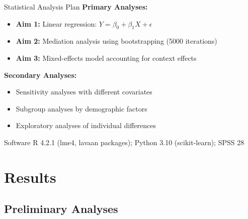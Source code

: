 \documentclass[aspectratio=169,11pt]{beamer}
\begin{document}
\begin{frame}{Statistical Analysis Plan}
  \textbf{Primary Analyses:}
  \begin{itemize}
    \item \textbf{Aim 1:} Linear regression: $Y = \beta_0 + \beta_1 X + \epsilon$
    \item \textbf{Aim 2:} Mediation analysis using bootstrapping (5000 iterations)
    \item \textbf{Aim 3:} Mixed-effects model accounting for context effects
  \end{itemize}

  \vspace{0.5cm}

  \textbf{Secondary Analyses:}
  \begin{itemize}
    \item Sensitivity analyses with different covariates
    \item Subgroup analyses by demographic factors
    \item Exploratory analyses of individual differences
  \end{itemize}

  \vspace{0.5cm}

  \begin{block}{Software}
    R 4.2.1 (lme4, lavaan packages); Python 3.10 (scikit-learn); SPSS 28
  \end{block}
\end{frame}


\section{Results}

\subsection{Preliminary Analyses}
\end{document}
